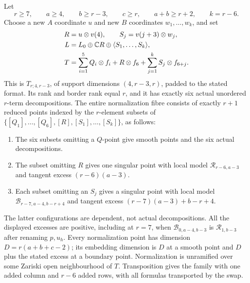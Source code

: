 \begin{theorem}\label{nb:E1}
Let
\[
 r\geq7,\qquad a\geq4,\qquad b\geq r-3,\qquad c\geq r,
 \qquad a+b\geq r+2,
 \qquad k=r-6.
\]
Choose a new $A$ coordinate $u$ and new $B$ coordinates
$w_1,\ldots,w_k$, and set
\begin{equation}\label{nb:E1-witness}
 \begin{split}
 R&=u\otimes v(4),\qquad S_j=v(j+3)\otimes w_j,\\
 L&=L_0\oplus\mathbb C R\oplus\langle S_1,\ldots,S_k\rangle,\\
 T&=\sum_{i=1}^5Q_i\otimes f_i+R\otimes f_6+
                         \sum_{j=1}^kS_j\otimes f_{6+j}.
 \end{split}
\end{equation}
This is $T_{r;4,r-3}$, of support dimensions $(4,r-3,r)$, padded to
the stated format. Its rank and border rank equal $r$, and it has
exactly six actual unordered $r$-term decompositions. The entire
normalization fibre consists of exactly $r+1$ reduced points indexed
by the $r$-element subsets of
$\{[Q_1],\ldots,[Q_6],[R],[S_1],\ldots,[S_k]\}$, as follows:
\begin{enumerate}
\item The six subsets omitting a $Q$-point give smooth points and
      the six actual decompositions.
\item The subset omitting $R$ gives one singular point with local
      model $\mathcal R_{r-6,a-3}$ and tangent excess $(r-6)(a-3)$.
\item Each subset omitting an $S_j$ gives a singular point with local
      model $\mathcal B_{r-7,a-4,b-r+4}$ and tangent excess
      $(r-7)(a-3)+b-r+4$.
\end{enumerate}
The latter configurations are dependent, not actual decompositions.
All the displayed excesses are positive, including at $r=7$, when
$\mathcal B_{0,a-4,b-3}$ is $\mathcal R_{1,b-3}$ after renaming
$p,u_h$. Every normalization point has dimension $D=r(a+b+c-2)$;
its embedding dimension is $D$ at a smooth point and $D$ plus the
stated excess at a boundary point. Normalization is unramified over
some Zariski open neighbourhood of $T$. Transposition gives the
family with one added column and $r-6$ added rows, with all formulas
transported by the swap.
\end{theorem}

